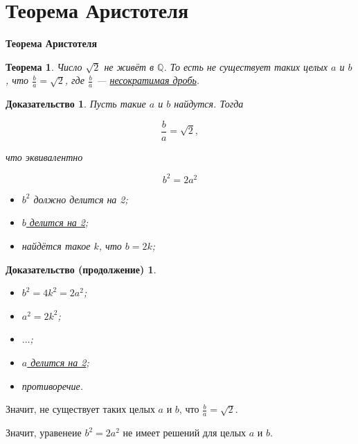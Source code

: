 \documentclass[11pt]{beamer}
\newtheorem{Th}{Теорема}
\newtheorem{Prof}{Доказательство}
\newtheorem{Profcont}{Доказательство (продолжение)}
\newcommand\fram[2]{\begin{frame}{\bf #1} #2 \end{frame}}
\begin{document}
\section{Теорема Аристотеля}
\fram{Теорема Аристотеля}{
\begin{Th}
Число $\sqrt{2}$ не живёт в $\mathbb{Q}$. То есть не существует таких целых $a$ и $b$, что $\frac{b}{a} = \sqrt{2}$, где $\frac{b}{a}$ --- \underline{несократимая дробь}.
\end{Th}
\begin{Prof}
Пусть такие $a$ и $b$ найдутся. Тогда \vspace{-4mm}

$$\frac{b}{a} = \sqrt{2},$$ \vspace{-6mm}

что эквивалентно \vspace{-6mm}

$$b^2 = 2a^2$$ \vspace{-9mm}

\begin{itemize}
\item $b^2$ должно делится на 2;
\item \underline{$b$ делится на 2};
\item найдётся такое $k$, что $b = 2k$;
\end{itemize}
\end{Prof}
}

\fram{}{
\begin{Profcont}
\begin{itemize}
\item $b^2 = 4k^2 = 2a^2$;
\item $a^2 = 2k^2$;
\item $\ldots$;
\item \underline{$a$ делится на 2};
\item противоречие.
\end{itemize}
\end{Profcont}

Значит, не существует таких целых $a$ и $b$, что $\frac{b}{a} = \sqrt{2}$.

Значит, уравенеие $b^2 = 2a^2$ не имеет решений для целых $a$ и $b$.
}
\end{document}
